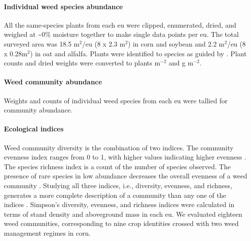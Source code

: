 \documentclass[
]{article}
\begin{document}
\hypertarget{individual-weed-species-abundance}{%
\paragraph*{Individual weed species abundance}\label{individual-weed-species-abundance}}

All the same-species plants from each eu were clipped, enumerated, dried, and weighed at \textasciitilde0\% moisture together to make single data points per eu. The total surveyed area was 18.5 m\(^2\)/eu (8 x 2.3 m\(^2\)) in corn and soybean and 2.2 m\(^2\)/eu (8 x 0.28m\(^2\)) in oat and alfalfa. Plants were identified to species as guided by \citet{uvaWeedsNortheast1997}. Plant counts and dried weights were converted to plants m\(^{-2}\) and g m\(^{-2}\).

\hypertarget{weed-community-abundance}{%
\paragraph*{Weed community abundance}\label{weed-community-abundance}}

Weights and counts of individual weed species from each eu were tallied for community abundance.

\hypertarget{ecological-indices}{%
\paragraph*{Ecological indices}\label{ecological-indices}}

Weed community diversity is the combination of two indices. The community evenness index ranges from 0 to 1, with higher values indicating higher evenness \citep{alataloProblemsMeasurementEvenness1981}. The species richness index is a count of the number of species observed. The presence of rare species in low abundance decreases the overall evenness of a weed community \citep{pielouInterpretationEcologicalData1984, stirlingEmpiricalRelationshipsSpecies2001}. Studying all three indices, i.e., diversity, evenness, and richness, generates a more complete description of a community than any one of the indices \citep{morrisChoosingUsingDiversity2014}. Simpson's diversity, evenness, and richness indices were calculated in terms of stand density and aboveground mass in each eu. We evaluated eighteen weed communities, corresponding to nine crop identities crossed with two weed management regimes in corn.
\end{document}
